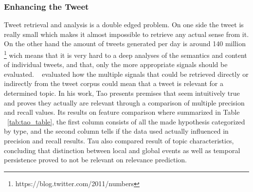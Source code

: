 \subsubsection{Enhancing the Tweet} 
\label{ssub:the_tweet}
Tweet retrieval and analysis is a double edged problem. On one side the tweet is really small which makes it almost impossible to retrieve any actual sense from it. On the other hand the amount of tweets generated per day is around 140 million \footnote{https://blog.twitter.com/2011/numbers} wich means that it is very hard to a deep analyses of the semantics and content of individual tweets, and that, only the more appropriate signals should be evaluated.
~\citet{Tao2012} evaluated how the multiple signals that could be retrieved directly or indirectly from the tweet corpus could mean that a tweet is relevant for a determined topic. In his work, Tao presents premises that seem intuitively true and proves they actually are relevant through a comparison of multiple precision and recall values. Its results on feature comparison where summarized in Table ~\ref{tab:tao_table}, the first column consists of all the made hypothesis categorized by type, and the second column tells if the data used actually influenced in precision and recall results. Tau also compared result of topic characteristics, concluding that distinction between local and global events as well as temporal persistence proved to not be relevant on relevance prediction.


